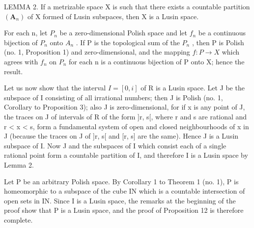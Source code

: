 LEMMA 2. If a metrizable space X is such that there exists a countable partition \((\mathbf{A}_{n})\) of X formed of Lusin subspaces, then X is a Lusin space.

For each n, let \(P_{n}\) be a zero-dimensional Polish space and let \(f_{n}\) be a continuous bijection of \(P_{n}\) onto \(A_{n}\) . If P is the topological sum of the \(P_{n}\) , then P is Polish (no. 1, Proposition 1) and zero-dimensional, and the mapping \(f: P \to X\) which agrees with \(f_{n}\) on \(P_{n}\) for each n is a continuous bijection of P onto X; hence the result.

Let us now show that the interval \(I = [0, i]\) of R is a Lusin space. Let J be the subspace of I consisting of all irrational numbers; then J is Polish (no. 1, Corollary to Proposition 3); also J is zero-dimensional, for if x is any point of J, the traces on J of intervals of R of the form {]}r, s{[}, where r and s are rational and r \textless{} x \textless{} s, form a fundamental system of open and closed neighbourhoods of x in J (because the traces on J of {]}r, s{[} and {[}r, s{]} are the same). Hence J is a Lusin subspace of I. Now J and the subspaces of I which consist each of a single rational point form a countable partition of I, and therefore I is a Lusin space by Lemma 2.

Let P be an arbitrary Polish space. By Corollary 1 to Theorem 1 (no. 1), P is homeomorphic to a subspace of the cube IN which is a countable intersection of open sets in IN. Since I is a Lusin space, the remarks at the beginning of the proof show that P is a Lusin space, and the proof of Proposition 12 is therefore complete.

